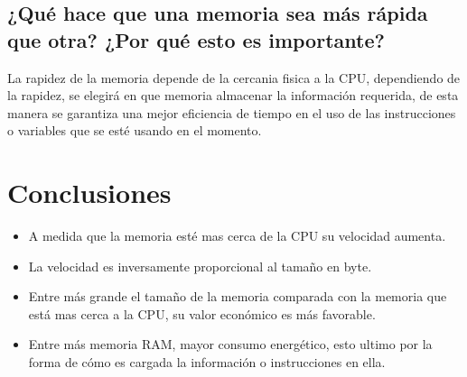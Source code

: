 \documentclass[12pt,letterpaper]{article}
\begin{document}
\subsection{¿Qué hace que una memoria sea más rápida que otra? ¿Por qué esto es importante?}
    La rapidez de la memoria depende de la cercania fisica a la CPU, dependiendo de la rapidez, se elegirá en que memoria almacenar la información requerida, de esta manera se garantiza una mejor eficiencia de tiempo en el uso de las instrucciones o variables que se esté usando en el momento.
        
\newpage

\section{Conclusiones}
    \begin{itemize}
        \item A medida que la memoria esté mas cerca de la CPU su velocidad aumenta.
        \item La velocidad es inversamente proporcional al tamaño en byte.
        \item Entre más grande el tamaño de la memoria comparada con la memoria que está mas cerca a la CPU, su valor económico es más favorable.
        \item Entre más memoria RAM, mayor consumo energético, esto ultimo por la forma de cómo es cargada la información o instrucciones en ella.
    \end{itemize}

\newpage



\end{document}

